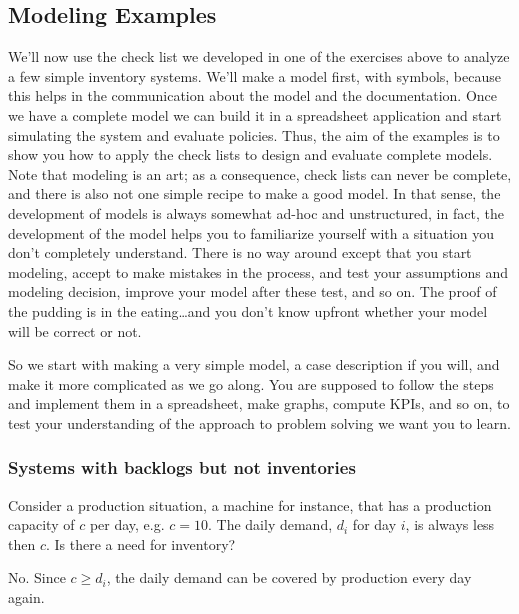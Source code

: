 \subsection{Modeling Examples}

We'll now use the check list we developed in one of the exercises
above to analyze a few simple inventory systems. We'll make a model
first, with symbols, because this helps in the communication about the
model and the documentation. Once we have a complete model we can
build it in a spreadsheet application and start simulating the system and evaluate
policies. Thus, the aim of the examples is to show you how to apply
the check lists to design and evaluate complete models. Note that
modeling is an art; as a consequence, check lists can never be
complete, and there is also not one simple recipe to make a good
model. In that sense, the development of models is always somewhat
ad-hoc and unstructured, in fact, the development of the model helps
you to familiarize yourself with a situation you don't completely
understand. There is no way around except that you start modeling,
accept to make mistakes in the process, and test your assumptions and
modeling decision, improve your model after these test, and so on. The
proof of the pudding is in the eating\ldots and you don't know upfront
whether your model will be correct or not.

So we start with making a very simple model, a case description if you
will, and make it more complicated as we go along.  You are supposed
to follow the steps and implement them in a spreadsheet, make graphs, compute
KPIs, and so on, to test your understanding of the approach to problem
solving we want you to learn.

\subsubsection{Systems with backlogs but not inventories}

\begin{question}
  Consider a production situation, a  machine for instance, that has a
  production capacity of  $c$ per day, e.g. $c=10$.  The daily demand,
  $d_i$ for day $i$, is always less then $c$. Is there a need for inventory?
\end{question}

  \begin{solution}
No. Since $c\geq d_i$, the daily demand can be covered by production every day again.     
  \end{solution}

